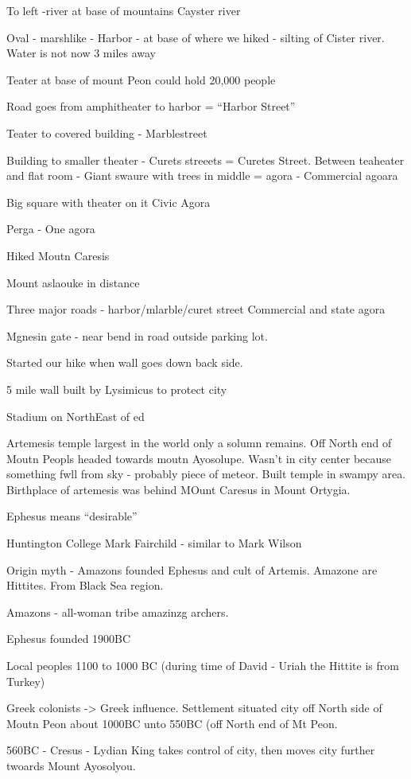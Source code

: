\documentclass[
]{book}
\begin{document}
To left -river at base of mountains Cayster river

Oval - marshlike - Harbor - at base of where we hiked - silting of Cister river. Water is not now 3 miles away

Teater at base of mount Peon could hold 20,000 people

Road goes from amphitheater to harbor = ``Harbor Street''

Teater to covered building - Marblestreet

Building to smaller theater - Curets streeets = Curetes Street. Between teaheater and flat room - Giant swaure with trees in middle = agora - Commercial agoara

Big square with theater on it Civic Agora

Perga - One agora

Hiked Moutn Caresis

Mount aslaouke in distance

Three major roads - harbor/mlarble/curet street
Commercial and state agora

Mgnesin gate - near bend in road outside parking lot.

Started our hike when wall goes down back side.

5 mile wall built by Lysimicus to protect city

Stadium on NorthEast of ed

Artemesis temple largest in the world only a solumn remains. Off North end of Moutn Peopls headed towards moutn Ayosolupe. Wasn't in city center because something fwll from sky - probably piece of meteor. Built temple in swampy area. Birthplace of artemesis was behind MOunt Caresus in Mount Ortygia.

Ephesus means ``desirable''

Huntington College Mark Fairchild - similar to Mark Wilson

Origin myth - Amazons founded Ephesus and cult of Artemis. Amazone are Hittites. From Black Sea region.

Amazons - all-woman tribe amazinzg archers.

Ephesus founded 1900BC

Local peoples 1100 to 1000 BC (during time of David - Uriah the Hittite is from Turkey)

Greek colonists -\textgreater{} Greek influence. Settlement situated city off North side of Moutn Peon about 1000BC unto 550BC (off North end of Mt Peon.

560BC - Cresus - Lydian King takes control of city, then moves city further twoards Mount Ayosolyou.
\end{document}
